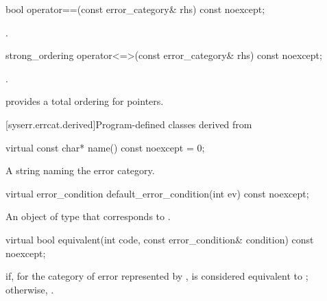 %
\begin{itemdecl}
bool operator==(const error_category& rhs) const noexcept;
\end{itemdecl}

\begin{itemdescr}
\pnum
\returns
{}.
\end{itemdescr}

%
\begin{itemdecl}
strong_ordering operator<=>(const error_category& rhs) const noexcept;
\end{itemdecl}

\begin{itemdescr}
\pnum
\returns
{}.

\begin{note}
 provides a total ordering for pointers.
\end{note}
\end{itemdescr}

[syserr.errcat.derived]{Program-defined classes derived from }

%
\begin{itemdecl}
virtual const char* name() const noexcept = 0;
\end{itemdecl}

\begin{itemdescr}
\pnum
\returns
A string naming the error category.
\end{itemdescr}

%
\begin{itemdecl}
virtual error_condition default_error_condition(int ev) const noexcept;
\end{itemdecl}

\begin{itemdescr}
\pnum
\returns
An object of type  that corresponds to .
\end{itemdescr}

%
\begin{itemdecl}
virtual bool equivalent(int code, const error_condition& condition) const noexcept;
\end{itemdecl}

\begin{itemdescr}
\pnum
\returns
{} if, for the category of error represented by ,  is considered equivalent to ; otherwise, .
\end{itemdescr}

